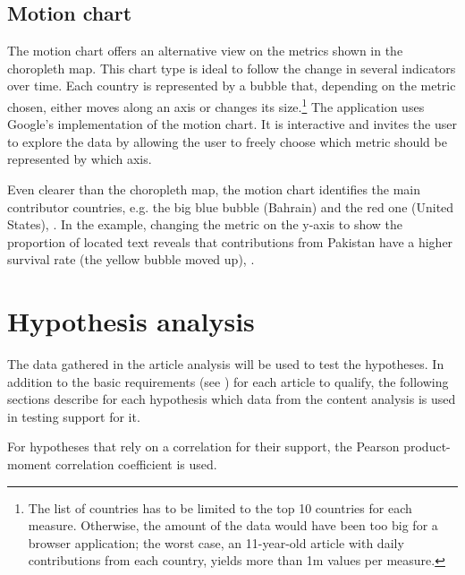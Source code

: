 \subsection{Motion chart}

The motion chart offers an alternative view on the metrics shown in the choropleth map.
This chart type is ideal to follow the change in several indicators over time.
Each country is represented by a bubble that, depending on the metric chosen, either moves along an axis or changes its size.\footnote{The list of countries has to be limited to the top 10 countries for each measure. Otherwise, the amount of the data would have been too big for a browser application; the worst case, an 11-year-old article with daily contributions from each country, yields more than 1m values per measure.}
The application uses Google's implementation of the motion chart.
It is interactive and invites the user to explore the data by allowing the user to freely choose which metric should be represented by which axis.


Even clearer than the choropleth map, the motion chart identifies the main contributor countries, e.g. the big blue bubble (Bahrain) and the red one (United States), .
In the example, changing the metric on the y-axis to show the proportion of located text reveals that contributions from Pakistan have a higher survival rate (the yellow bubble moved up), . 



\section{Hypothesis analysis}\label{hypothesesanalysis}

The data gathered in the article analysis will be used to test the hypotheses.
In addition to the basic requirements (see ) for each article to qualify, the following sections describe for each hypothesis which data from the content analysis is used in testing support for it.

For hypotheses that rely on a correlation for their support, the Pearson product-moment correlation coefficient is used.

